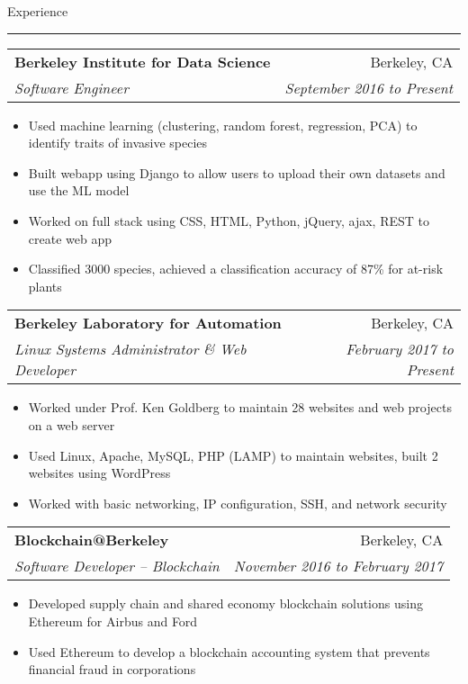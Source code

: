 \documentclass[11pt,letterpaper]{article}
\makeatletter
\newenvironment{topic}[1]
    {
    {\Large \centerline{#1}}
    \vspace*{0.03in}
    \hrule 
    \vspace*{0.05in}
    }
    {}
\newenvironment{event}
    {
    \begin{tabular*}{\textwidth}{l@{\extracolsep{\fill}}r}
    }
    {
    \end{tabular*}
    }
\makeatother
\begin{document}
    \begin{topic}{Experience}
        \begin{event}
            \textbf{Berkeley Institute for Data Science} & Berkeley, CA \\
            \emph{Software Engineer} & \emph{September 2016 to Present} \\
        \end{event}
            \begin{itemize}
                \item Used machine learning (clustering, random forest, regression, PCA) to identify traits of invasive species
                \item Built webapp using Django to allow users to upload their own datasets and use the ML model
                \item Worked on full stack using CSS, HTML, Python, jQuery, ajax, REST to create web app 
                \item Classified 3000 species, achieved a classification accuracy of 87\% for at-risk plants
            \end{itemize}
        \vspace*{0.1in}

        \begin{event}
            \textbf{Berkeley Laboratory for Automation} & Berkeley, CA \\
            \emph{Linux Systems Administrator \& Web Developer} & \emph{February 2017 to Present}
        \end{event}
            \begin{itemize}
                \item Worked under Prof. Ken Goldberg to maintain 28 websites and web projects on a web server
                \item Used Linux, Apache, MySQL, PHP (LAMP) to maintain websites, built 2 websites using WordPress
                \item Worked with basic networking, IP configuration, SSH, and network security
            \end{itemize}
        \vspace*{0.1in}

        \begin{event}
            \textbf{Blockchain@Berkeley} & Berkeley, CA \\
            \emph{Software Developer -- Blockchain} & \emph{November 2016 to February 2017}
        \end{event}
            \begin{itemize}
                \item Developed supply chain and shared economy blockchain solutions using Ethereum for Airbus and Ford
                \item Used Ethereum to develop a blockchain accounting system that prevents financial fraud in corporations
            \end{itemize}
        
    \end{topic} \vspace*{0.1in}
\end{document}

